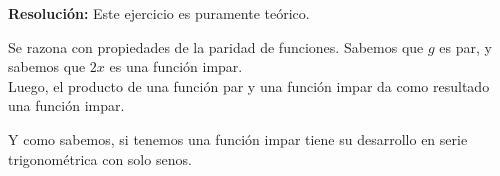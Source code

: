 \documentclass[11pt]{article}
\begin{document}
	\textbf{Resolución:}
	Este ejercicio es puramente teórico.
	
	Se razona con propiedades de la paridad de funciones. Sabemos que $g$ es par, y sabemos que $2x$ es una función impar. \\
	Luego, el producto de una función par y una función impar da como resultado una función impar.
	
	Y como sabemos, si tenemos una función impar tiene su desarrollo en serie trigonométrica con solo senos.
	
\end{document}
